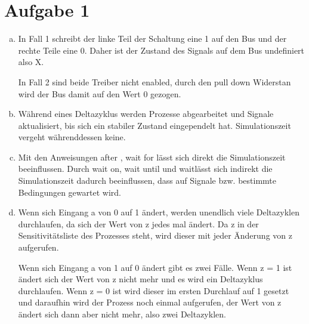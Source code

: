 \documentclass[a4paper]{scrartcl}
\begin{document}
	
	\section*{Aufgabe 1}
	
	\begin{enumerate}[(a)]
		
\item In Fall 1 schreibt der linke Teil der Schaltung eine 1 auf den Bus und der rechte Teile eine 0. Daher ist der Zustand des Signals auf dem Bus undefiniert also X.

In Fall 2 sind beide Treiber nicht enabled, durch den pull down Widerstan wird der Bus damit auf den Wert 0 gezogen.

\item Während eines Deltazyklus werden Prozesse abgearbeitet und Signale aktualisiert, bis sich ein stabiler Zustand eingependelt hat. Simulationszeit vergeht währenddessen keine.

\item Mit den Anweisungen \glqq after \grqq, \glqq wait for \grqq \hspace{5pt} lässt sich direkt die Simulationszeit beeinflussen. Durch \glqq wait on\grqq, \glqq wait until \grqq und \glqq wait\grqq lässt sich indirekt die Simulationszeit dadurch beeinflussen, dass auf Signale bzw. bestimmte Bedingungen gewartet wird.

\item Wenn sich Eingang a von 0 auf 1 ändert, werden unendlich viele Deltazyklen durchlaufen, da sich der Wert von z jedes mal ändert. Da z in der Sensitivitätsliste des Prozesses steht, wird dieser mit jeder Änderung von z aufgerufen. 

Wenn sich Eingang a von 1 auf 0 ändert gibt es zwei Fälle. Wenn z = 1 ist ändert sich der Wert von z nicht mehr und es wird ein Deltazyklus durchlaufen.
Wenn z = 0 ist wird dieser im ersten Durchlauf auf 1 gesetzt und daraufhin wird der Prozess noch einmal aufgerufen, der Wert von z ändert sich dann aber nicht mehr, also zwei Deltazyklen. 

	
	\end{enumerate}

	
\end{document}
